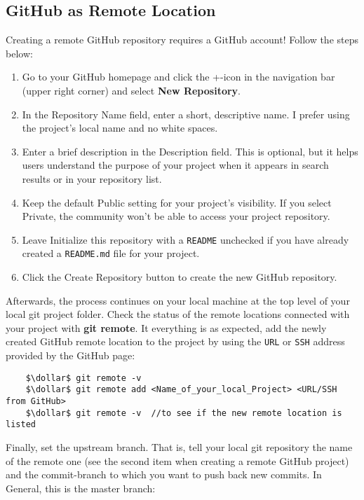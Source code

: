 \subsection{GitHub as Remote Location}
\label{chapter:1.3.2}



Creating a remote GitHub repository requires a GitHub account! Follow the steps below:

\begin{enumerate}
	\item Go to your GitHub homepage and click the +-icon in the navigation bar (upper right corner) and select \textbf{New Repository}.
	\item In the Repository Name field, enter a short, descriptive name. I prefer using the project's local name and no white spaces.
	\item Enter a brief description in the Description field. This is optional, but it helps users understand the purpose of your project when it appears in search 
	results or in your repository list.
	\item Keep the default Public setting for your project's visibility. If you select Private, the community won't be able to access your project repository.
	\item Leave Initialize this repository with a \verb|README| unchecked if you have already created a \verb|README.md| file for your project.
	\item Click the Create Repository button to create the new GitHub repository.
\end{enumerate}

Afterwards, the process continues on your local machine at the top level of your local git project folder. Check the status of the remote locations connected with 
your project with \textbf{git remote}. It everything is as expected, add the newly created GitHub remote location to the project by using the \verb|URL| or \verb|SSH|
address provided by the GitHub page:

\begin{lstlisting}
	$\dollar$ git remote -v
	$\dollar$ git remote add <Name_of_your_local_Project> <URL/SSH from GitHub>
	$\dollar$ git remote -v  //to see if the new remote location is listed
\end{lstlisting}

Finally, set the upstream branch. That is, tell your local git repository the name of the remote one (see the second item when creating a remote GitHub project) and the 
commit-branch to which you want to push back new commits. In General, this is the master branch:

